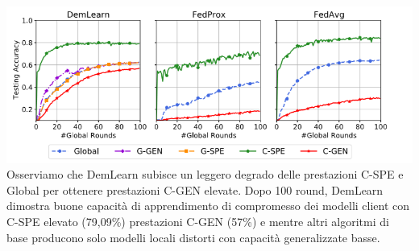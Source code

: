 \includegraphics[scale=0.6]{cifar10Comparison}
 \vspace{0.5cm}
Osserviamo che DemLearn subisce un leggero degrado delle prestazioni C-SPE e Global per ottenere prestazioni C-GEN elevate. Dopo 100 round, DemLearn dimostra buone capacità di apprendimento di compromesso dei modelli client con C-SPE elevato (79,09\%) prestazioni C-GEN (57\%) e mentre altri algoritmi di base producono solo modelli locali distorti con capacità generalizzate basse.\\\\

